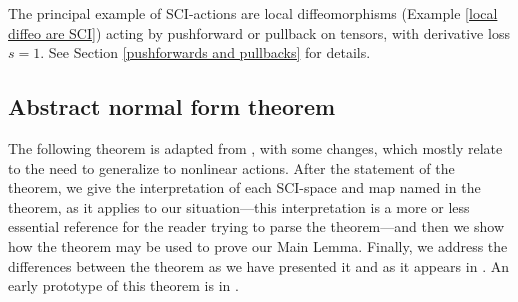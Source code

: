 \documentclass{article}
\begin{document}
\begin{example}\label{pullbacks are SCI}
The principal example of SCI-actions are local diffeomorphisms (Example \ref{local diffeo are SCI}) acting by pushforward or pullback on tensors, with derivative loss $s=1$.  See Section \ref{pushforwards and pullbacks} for details.
\end{example}


\subsection{Abstract normal form theorem}

The following theorem is adapted from \cite[Thm. 6.8]{MirandaMonnierZung}, with some changes, which mostly relate to the need to generalize to nonlinear actions.  After the statement of the theorem, we give the interpretation of each SCI-space and map named in the theorem, as it applies to our situation---this interpretation is a more or less essential reference for the reader trying to parse the theorem---and then we show how the theorem may be used to prove our Main Lemma.  Finally, we address the differences between the theorem as we have presented it and as it appears in \cite{MirandaMonnierZung}.  An early prototype of this theorem is in \cite{MonnierZung}.
\end{document}
